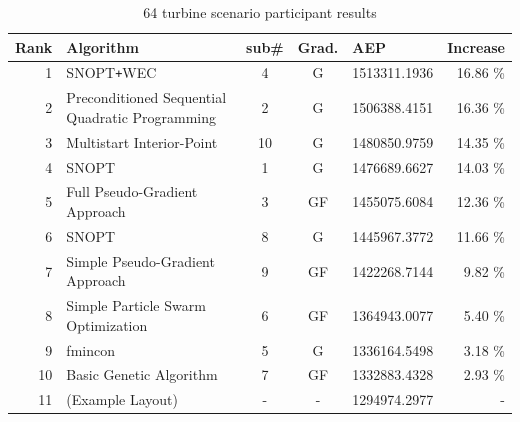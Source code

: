 \begin{table}[htbp]

			\begin{center}
				\caption{64 turbine scenario participant results}
				\label{tab:results3}
				\begin{tabular}{r l c c l r}
					\hline
					Rank	& Algorithm											& sub\#	& Grad.	& AEP			& Increase		\\	%
					\hline
					1		& SNOPT\texttt{+}WEC								& 4 	& G		& 1513311.1936	&	16.86 \% 	\\ %
					2		& Preconditioned Sequential Quadratic Programming	& 2		& G		& 1506388.4151	&	16.36 \% 	\\ %
					3		& Multistart Interior-Point							& 10	& G		& 1480850.9759	&	14.35 \% 	\\ %
					4		& SNOPT												& 1		& G		& 1476689.6627 	&	14.03 \% 	\\ %
					5		& Full Pseudo-Gradient Approach						& 3		& GF	& 1455075.6084	&	12.36 \% 	\\ %
					6		& SNOPT												& 8		& G		& 1445967.3772	&	11.66 \% 	\\ %
					7		& Simple Pseudo-Gradient Approach					& 9		& GF	& 1422268.7144	&	9.82 \% 	\\ %
					8		& Simple Particle Swarm Optimization				& 6		& GF    & 1364943.0077	&	5.40 \% 	\\ %
					9		& fmincon											& 5		& G		& 1336164.5498 	&	3.18 \% 	\\ %
					10		& Basic Genetic Algorithm							& 7		& GF	& 1332883.4328	&	2.93 \% 	\\ %
					11		& (Example Layout)									& -		& -		& 1294974.2977	&	- 			\\ %
					\hline
				\end{tabular}
			\end{center}
		\end{table}

